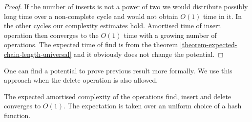 \begin{proof}
If the number of inserts is not a power of two we would distribute possibly long time over a non-complete cycle and would not obtain $O(1)$ time in it. In the other cycles our complexity estimates hold. Amortised time of insert operation then converges to the $O(1)$ time with a growing number of operations. The expected time of find is from the theorem \ref{theorem-expected-chain-length-universal} and it obviously does not change the potential.
\end{proof}

One can find a potential to prove previous result more formally. We use this approach when the delete operation is also allowed.

\begin{theorem}
The expected amortised complexity of the operations find, insert and delete converges to $O(1)$. The expectation is taken over an uniform choice of a hash function.
\end{theorem}
